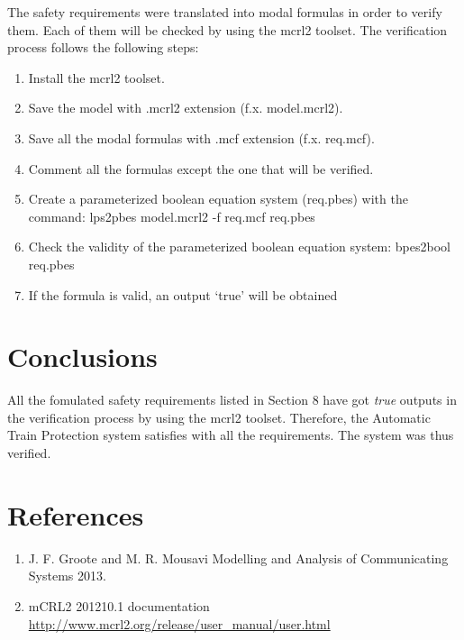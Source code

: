 \documentclass[11pt,a4paper]{article}
\begin{document}
The safety requirements were translated into modal formulas in order to verify them. Each of them will be checked by using the mcrl2 toolset.  The verification process follows the following steps: \\
\begin{enumerate} 
	\item Install the mcrl2 toolset. \\

    \item Save the model with .mcrl2 extension (f.x. model.mcrl2). \\

    \item Save all the modal formulas with .mcf extension (f.x. req.mcf). \\

    \item Comment all the formulas except the one that will be verified. \\

    \item  Create a parameterized boolean equation system (req.pbes) with the command: lps2pbes model.mcrl2 -f req.mcf req.pbes \\

    \item Check the validity of the parameterized boolean equation system:
bpes2bool req.pbes \\

    \item If the formula is valid, an output ‘true’ will be obtained




\end{enumerate}

\newpage
\section{Conclusions}

All the fomulated safety requirements listed in Section 8 have got \emph{true} outputs in the verification process by using the mcrl2 toolset. Therefore, the Automatic Train Protection system satisfies with all the requirements. The system was thus verified.

\newpage
\section{References}
\begin{enumerate}
\item J. F. Groote and M. R. Mousavi Modelling and Analysis of Communicating Systems 2013. \\
\item mCRL2 201210.1 documentation 
\url{http://www.mcrl2.org/release/user_manual/user.html}
\end{enumerate}
\end{document}
